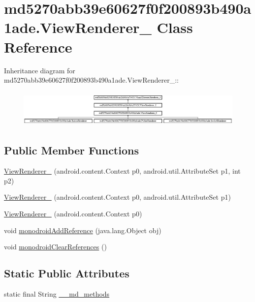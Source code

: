 \hypertarget{classmd5270abb39e60627f0f200893b490a1ade_1_1_view_renderer__2}{
\section{md5270abb39e60627f0f200893b490a1ade.ViewRenderer\_ Class Reference}
\label{classmd5270abb39e60627f0f200893b490a1ade_1_1_view_renderer__2}
}
Inheritance diagram for md5270abb39e60627f0f200893b490a1ade.ViewRenderer\_::\begin{figure}[H]
\begin{center}
\leavevmode
\includegraphics[height=1.87135cm]{classmd5270abb39e60627f0f200893b490a1ade_1_1_view_renderer__2}
\end{center}
\end{figure}
\subsection*{Public Member Functions}
\begin{CompactItemize}
\item 
\hyperlink{classmd5270abb39e60627f0f200893b490a1ade_1_1_view_renderer__2_34f641fdb772410dc88ca2ac5c3fb492}{ViewRenderer\_} (android.content.Context p0, android.util.AttributeSet p1, int p2)
\item 
\hyperlink{classmd5270abb39e60627f0f200893b490a1ade_1_1_view_renderer__2_0295102267caddfc524759e82d0f5b04}{ViewRenderer\_} (android.content.Context p0, android.util.AttributeSet p1)
\item 
\hyperlink{classmd5270abb39e60627f0f200893b490a1ade_1_1_view_renderer__2_7f4b9d7dd89bbae2b8dd2f6c799e4c02}{ViewRenderer\_} (android.content.Context p0)
\item 
void \hyperlink{classmd5270abb39e60627f0f200893b490a1ade_1_1_view_renderer__2_04a86dd6eb699648d23fe42d567c6962}{monodroidAddReference} (java.lang.Object obj)
\item 
void \hyperlink{classmd5270abb39e60627f0f200893b490a1ade_1_1_view_renderer__2_4832372c2c5755cd4e9f279f9b051454}{monodroidClearReferences} ()
\end{CompactItemize}
\subsection*{Static Public Attributes}
\begin{CompactItemize}
\item 
static final String \hyperlink{classmd5270abb39e60627f0f200893b490a1ade_1_1_view_renderer__2_c66b6f41d2afba0df6ae890c8f2b644b}{\_\-\_\-md\_\-methods}
\end{CompactItemize}
